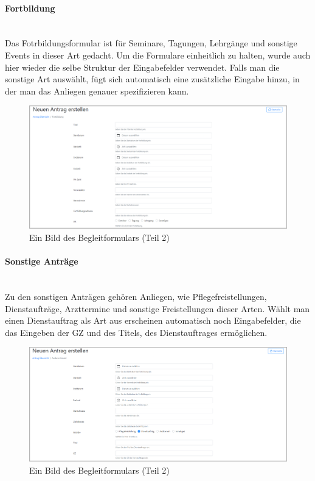\paragraph{Fortbildung}
~\\
Das Fotrbildungsformular ist für Seminare, Tagungen, Lehrgänge und sonstige Events in dieser Art gedacht. Um die Formulare einheitlich zu halten, wurde auch hier wieder die selbe Struktur der Eingabefelder verwendet. Falls man die sonstige Art auswählt, fügt sich automatisch eine zusätzliche Eingabe hinzu, in der man das Anliegen genauer spezifizieren kann.
\begin{figure}[H]
	\centering
	\includegraphics[width=1\linewidth]{images/website/fortbildung_1}
	\caption[Neuer Schulantrag]{Ein Bild des Begleitformulars (Teil 2)}
	\label{fig:frotbildung}
\end{figure}

\paragraph{Sonstige Anträge}
~\\
Zu den sonstigen Anträgen gehören Anliegen, wie Pflegefreistellungen, Dienstaufträge, Arzttermine und sonstige Freistellungen dieser Arten. Wählt man einen Dienstauftrag als Art aus erscheinen automatisch noch Eingabefelder, die das Eingeben der GZ und des Titels, des Dienstauftrages ermöglichen.
\begin{figure}[H]
	\centering
	\includegraphics[width=1\linewidth]{images/website/dienstauftrag}
	\caption[Neuer Schulantrag]{Ein Bild des Begleitformulars (Teil 2)}
	\label{fig:dienst}
\end{figure}

